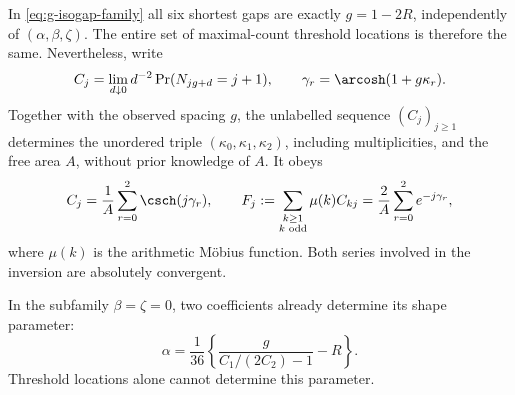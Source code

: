 \begin{theorem}
\label{thm:g-inverse}
In \eqref{eq:g-isogap-family} all six shortest gaps are exactly
$g=1-2R$, independently of $(\alpha,\beta,\zeta)$. The entire set of
maximal-count threshold locations is therefore the same. Nevertheless,
write
\[
 C_j=\lim_{d\downarrow0}d^{-2}\Pr(N_{jg+d}=j+1),\qquad
 \gamma_r=\arcosh(1+g\kappa_r).
\]
Together with the observed spacing $g$, the unlabelled sequence
$(C_j)_{j\ge1}$ determines the unordered triple
$(\kappa_0,\kappa_1,\kappa_2)$, including multiplicities, and the free
area $A$, without prior knowledge of $A$. It obeys
\begin{equation}\label{eq:g-mobius}
 C_j=\frac1A\sum_{r=0}^2\csch(j\gamma_r),\qquad
 F_j:=\sum_{\substack{k\ge1\\ k\text{ odd}}}\mu(k)C_{kj}
       =\frac2A\sum_{r=0}^2e^{-j\gamma_r},
\end{equation}
where $\mu(k)$ is the arithmetic M\"obius function. Both series involved
in the inversion are absolutely convergent.

In the subfamily $\beta=\zeta=0$, two coefficients already determine
its shape parameter:
\begin{equation}\label{eq:g-two-amplitude-inverse}
 \alpha=\frac1{36}\left\{
       \frac{g}{C_1/(2C_2)-1}-R\right\}.
\end{equation}
Threshold locations alone cannot determine this parameter.
\end{theorem}
